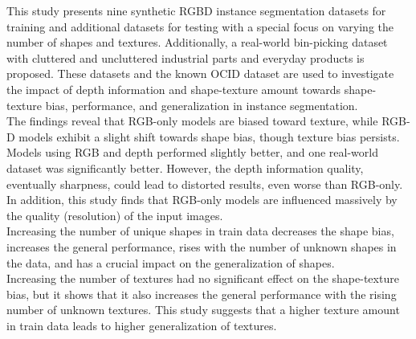 This study presents nine synthetic RGBD instance segmentation datasets for training and additional datasets for testing with a special focus on varying the number of shapes and textures. Additionally, a real-world bin-picking dataset with cluttered and uncluttered industrial parts and everyday products is proposed. These datasets and the known OCID dataset are used to investigate the impact of depth information and shape-texture amount towards shape-texture bias, performance, and generalization in instance segmentation.\\
The findings reveal that RGB-only models are biased toward texture, while RGB-D models exhibit a slight shift towards shape bias, though texture bias persists. Models using RGB and depth performed slightly better, and one real-world dataset was significantly better. However, the depth information quality, eventually sharpness, could lead to distorted results, even worse than RGB-only. In addition, this study finds that RGB-only models are influenced massively by the quality (resolution) of the input images.\\
Increasing the number of unique shapes in train data decreases the shape bias, increases the general performance, rises with the number of unknown shapes in the data, and has a crucial impact on the generalization of shapes. \\
Increasing the number of textures had no significant effect on the shape-texture bias, but it shows that it also increases the general performance with the rising number of unknown textures. This study suggests that a higher texture amount in train data leads to higher generalization of textures.




